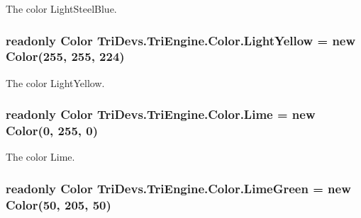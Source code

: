 The color Light\-Steel\-Blue. 

\hypertarget{struct_tri_devs_1_1_tri_engine_1_1_color_ae27e9f34bc79dc4832d35f80aba535a6}{
\subsubsection[{Light\-Yellow}]{\setlength{\rightskip}{0pt plus 5cm}readonly {\bf Color} Tri\-Devs.\-Tri\-Engine.\-Color.\-Light\-Yellow = new {\bf Color}(255, 255, 224)\hspace{0.3cm}{\ttfamily [static]}}}\label{struct_tri_devs_1_1_tri_engine_1_1_color_ae27e9f34bc79dc4832d35f80aba535a6}


The color Light\-Yellow. 

\hypertarget{struct_tri_devs_1_1_tri_engine_1_1_color_a05cbcba22a8363233728e10e2281ac32}{
\subsubsection[{Lime}]{\setlength{\rightskip}{0pt plus 5cm}readonly {\bf Color} Tri\-Devs.\-Tri\-Engine.\-Color.\-Lime = new {\bf Color}(0, 255, 0)\hspace{0.3cm}{\ttfamily [static]}}}\label{struct_tri_devs_1_1_tri_engine_1_1_color_a05cbcba22a8363233728e10e2281ac32}


The color Lime. 

\hypertarget{struct_tri_devs_1_1_tri_engine_1_1_color_a7408d8285684036df25b41b593bda8fe}{
\subsubsection[{Lime\-Green}]{\setlength{\rightskip}{0pt plus 5cm}readonly {\bf Color} Tri\-Devs.\-Tri\-Engine.\-Color.\-Lime\-Green = new {\bf Color}(50, 205, 50)\hspace{0.3cm}{\ttfamily [static]}}}\label{struct_tri_devs_1_1_tri_engine_1_1_color_a7408d8285684036df25b41b593bda8fe}


